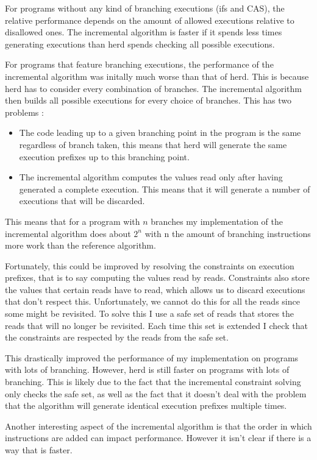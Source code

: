 \documentclass[a4,11pt,dvipsnames]{article}
\begin{document}
For programs without any kind of branching executions (ifs and CAS), the relative performance depends on the amount of allowed executions relative to disallowed ones. The incremental algorithm is faster if it spends less times generating executions than herd spends checking all possible executions.

For programs that feature branching executions, the performance of the incremental algorithm was initally much worse than that of herd. This is because herd has to consider every combination of branches. The incremental algorithm then builds all possible executions for every choice of branches. This has two problems :
\begin{itemize}
\item The code leading up to a given branching point in the program is the same regardless of branch taken, this means that herd will generate the same execution prefixes up to this branching point.
\item The incremental algorithm computes the values read only after having generated a complete execution. This means that it will generate a number of executions that will be discarded.
\end{itemize}
This means that for a program with $n$ branches my implementation of the incremental algorithm does about $2^{n}$ with n the amount of branching instructions more work than the reference algorithm.

Fortunately, this could be improved by resolving the constraints on execution prefixes, that is to say computing the values read by reads. Constraints also store the values that certain reads have to read, which allows us to discard executions that don't respect this. Unfortunately, we cannot do this for all the reads since some might be revisited. To solve this I use a safe set of reads that stores the reads that will no longer be revisited. Each time this set is extended I check that the constraints are respected by the reads from the safe set.

This drastically improved the performance of my implementation on programs with lots of branching. However, herd is still faster on programs with lots of branching. This is likely due to the fact that the incremental constraint solving only checks the safe set, as well as the fact that it doesn't deal with the problem that the algorithm will generate identical execution prefixes multiple times.

Another interesting aspect of the incremental algorithm is that the order in which instructions are added can impact performance. However it isn't clear if there is a way that is faster.
\end{document}
